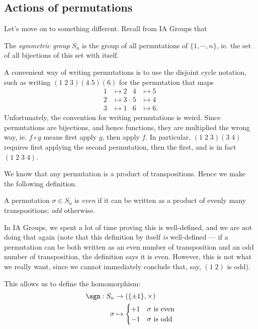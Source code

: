 \documentclass[a4paper]{article}
\begin{document}
\subsection{Actions of permutations}
Let's move on to something different. Recall from IA Groups that
\begin{defi}
  The \emph{symmetric group} $S_n$ is the group of all permutations of $\{1, \cdots, n\}$, ie. the set of all bijections of this set with itself.
\end{defi}

A convenient way of writing permutations is to use the disjoint cycle notation, such as writing $(1\; 2\; 3)(4\; 5)(6)$ for the permutation that maps
\begin{align*}
  1 &\mapsto 2 & 4 &\mapsto 5\\
  2 &\mapsto 3 & 5 &\mapsto 4\\
  3 &\mapsto 1 & 6 &\mapsto 6.
\end{align*}
Unfortunately, the convention for writing permutations is weird. Since permutations are bijections, and hence functions, they are multiplied the wrong way, ie. $f \circ g$ means first apply $g$, then apply $f$. In particular, $(1\; 2\; 3) (3\; 4)$ requires first applying the second permutation, then the first, and is in fact $(1\; 2\; 3\; 4)$.

We know that any permutation is a product of transpositions. Hence we make the following definition.
\begin{defi}
  A permutation $\sigma \in S_n$ is \emph{even} if it can be written as a product of evenly many transpositions; \emph{odd} otherwise.
\end{defi}
In IA Groups, we spent a lot of time proving this is well-defined, and we are not doing that again (note that this definition by itself \emph{is} well-defined --- if a permutation can be both written as an even number of transposition and an odd number of transposition, the definition says it is even. However, this is not what we really want, since we cannot immediately conclude that, say, $(1\; 2)$ is odd).

This allows us to define the homomorphism:
\begin{align*}
  \sgn: S_n &\to (\{\pm 1\}, \times)\\
  \sigma &\mapsto
  \begin{cases}
    +1 & \sigma\text{ is even}\\
    -1 & \sigma\text{ is odd}
  \end{cases}
\end{align*}
\end{document}
